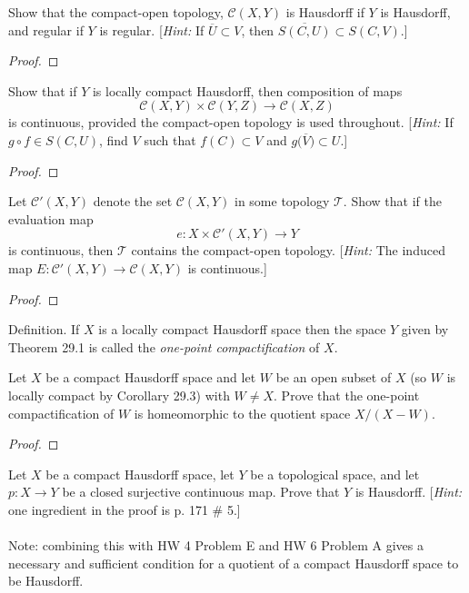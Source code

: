 \begin{problem}[Munkres \S 46, Ex.\,6]
Show that the compact-open topology, $\mathcal{C}(X,Y)$ is
Hausdorff if $Y$ is Hausdorff, and regular if $Y$ is
regular. [\emph{Hint:} If $\overline U\subset V$, then
$\overline{S(C,U)}\subset S(C,V)$.]
\end{problem}
\begin{proof}
\end{proof}
\newpage
\begin{problem}[Munkres \S 46, Ex.\,7]
Show that if $Y$ is locally compact Hausdorff, then composition
of maps
\[\mathcal{C}(X,Y)\times\mathcal{C}(Y,Z)\longrightarrow\mathcal{C}(X,Z)\]
is continuous, provided the compact-open topology is used
throughout. [\emph{Hint:} If $g\circ f\in S(C,U)$, find $V$ such
that $f(C)\subset V$ and $g\bigl(\overline{V}\bigr)\subset U$.]
\end{problem}
\begin{proof}
\end{proof}
\newpage
\begin{problem}[Munkres \S 46, Ex.\,8]
Let $\mathcal{C}'(X,Y)$ denote the set $\mathcal{C}(X,Y)$ in some
topology $\mathcal{T}$. Show that if the evaluation map
\[
e\colon X\times\mathcal{C}'(X,Y)\longrightarrow Y
\]
is continuous, then $\mathcal{T}$ contains the compact-open
topology. [\emph{Hint:} The induced map
$E\colon\mathcal{C}'(X,Y)\to\mathcal{C}(X,Y)$ is continuous.]
\end{problem}
\begin{proof}
\end{proof}
\newpage
\begin{problem}[(A)]
\begin{definition}
Definition. If $X$ is a locally compact Hausdorff space then the
space $Y$ given by Theorem 29.1 is called the \emph{one-point
  compactification} of $X$.
\end{definition}

Let $X$ be a compact Hausdorff space and let $W$ be an open
subset of $X$ (so $W$ is locally compact by Corollary 29.3) with
$W\neq X$. Prove that the one-point compactification of $W$ is
homeomorphic to the quotient space $X/(X-W)$.
\end{problem}
\begin{proof}
\end{proof}
\newpage
\begin{problem}[(B)]
Let $X$ be a compact Hausdorff space, let $Y$ be a topological
space, and let $p\colon X\to Y$ be a closed surjective continuous
map. Prove that $Y$ is Hausdorff. [\emph{Hint:} one ingredient in the
proof is p. 171 \# 5.]
\\\\
Note: combining this with HW 4 Problem E and HW 6 Problem A gives
a necessary and sufficient condition for a quotient of a compact
Hausdorff space to be Hausdorff.
\end{problem}
